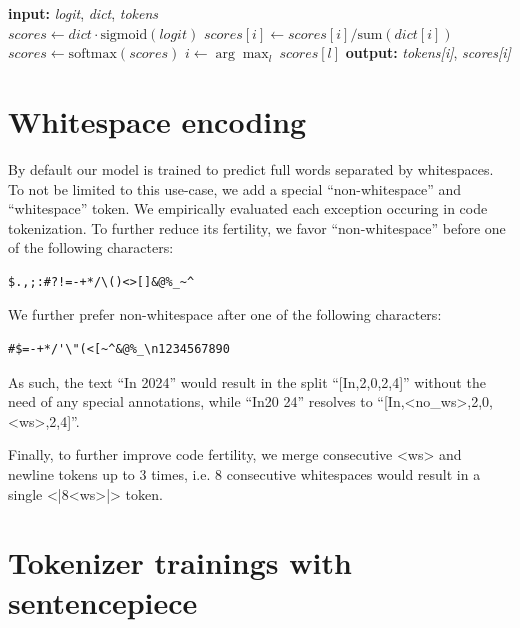\documentclass[11pt]{article}
\begin{document}
\begin{algorithm}[h!]
\caption{decode}\label{alg:decode}
\begin{algorithmic}
\State \textbf{input:} \emph{logit}, \emph{dict}, \emph{tokens}\\
\vspace{4px}
\State $scores \gets dict \cdot \textrm{sigmoid}(logit)$
\State $scores[i] \gets scores[i]/\textrm{sum}(dict[i])$
\EndFor
\State $scores \gets \textrm{softmax}(scores)$
\State $i \gets \arg\max_l\ scores[l]$\vspace{4px}
\State \textbf{output:} \emph{tokens[i]}, \emph{scores[i]}
\end{algorithmic}
\end{algorithm}


\section{Whitespace encoding}
\label{sec:whitespace}
By default our model is trained to predict full words separated by whitespaces. To not be limited to this use-case, we add a special ``non-whitespace'' and ``whitespace'' token. We empirically evaluated each exception occuring in code tokenization.
To further reduce its fertility, we favor ``non-whitespace'' before one of the following characters:
\begin{lstlisting}
$.,;:#?!=-+*/\()<>[]&@%_~^
\end{lstlisting}
We further prefer non-whitespace after one of the following characters:
\begin{lstlisting}
#$=-+*/'\"(<[~^&@%_\n1234567890
\end{lstlisting}

As such, the text ``In 2024'' would result in the split ``[In,2,0,2,4]'' without the need of any special annotations, while ``In20 24'' resolves to ``[In,<no\_ws>,2,0,<ws>,2,4]''.

Finally, to further improve code fertility, we merge consecutive <ws> and newline tokens up to 3 times, i.e. $8$ consecutive whitespaces would result in a single <|8<ws>|> token.


\section{Tokenizer trainings with sentencepiece}
\label{app:sentencepiece}
\end{document}
